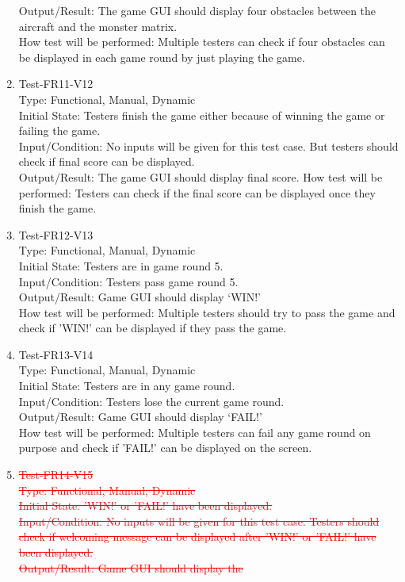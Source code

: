 \documentclass[12pt]{article}
\begin{document}
\begin{enumerate}[1.]
Output/Result: The game GUI should display four obstacles
between the aircraft and the monster matrix.\\
How test will be performed: Multiple testers can check
if four obstacles can be displayed in each game round 
by just playing the game.
\item Test-FR11-V12\\
Type: Functional, Manual, Dynamic\\
Initial State: Testers finish the game either because of 
winning the game or failing the game.\\
Input/Condition: No inputs will be given for this test case. But testers should check if final score can be displayed.\\
Output/Result: The game GUI should display final score.
How test will be performed: Testers can check if the final score can be displayed once they finish the game.
\item Test-FR12-V13\\
Type: Functional, Manual, Dynamic\\
Initial State: Testers are in game round 5.\\
Input/Condition: Testers pass game round 5.\\ 
Output/Result: Game GUI should display ‘WIN!’\\
How test will be performed: Multiple testers should try
to pass the game and check if 'WIN!' can be displayed 
if they pass the game.
\item Test-FR13-V14\\ 
Type: Functional, Manual, Dynamic\\
Initial State: Testers are in any game round.\\
Input/Condition: Testers lose the current game round.\\
Output/Result: Game GUI should display ‘FAIL!’\\
How test will be performed: Multiple testers can fail 
any game round on purpose and check if 'FAIL!' can 
be displayed on the screen.
\newpage
\item \textcolor{red}{\st{Test-FR14-V15\\
Type: Functional, Manual, Dynamic\\
Initial State: 'WIN!' or 'FAIL!' have been 
displayed.\\
Input/Condition: No inputs will be given for this test
case. Testers should check if welcoming message can be
displayed after 'WIN!' or 'FAIL!' have been displayed.\\ 
Output/Result: Game GUI should display the 
}}
\end{enumerate}
\end{document}
